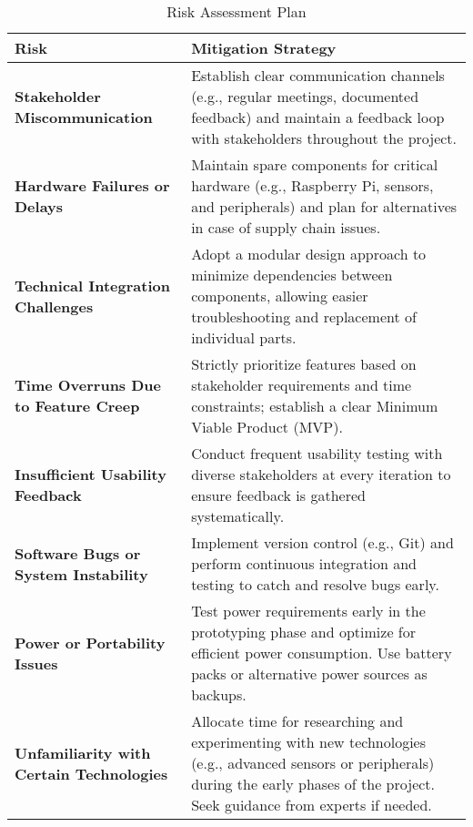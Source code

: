 \begin{table}[h!]
	\centering
	\caption{Risk Assessment Plan}
	\begin{tabular}{|p{4cm}|p{8cm}|}
		\hline
		\textbf{Risk} & \textbf{Mitigation Strategy} \\
		\hline
		\textbf{Stakeholder Miscommunication} & Establish clear communication channels (e.g., regular meetings, documented feedback) and maintain a feedback loop with stakeholders throughout the project. \\
		\hline
		\textbf{Hardware Failures or Delays} & Maintain spare components for critical hardware (e.g., Raspberry Pi, sensors, and peripherals) and plan for alternatives in case of supply chain issues. \\
		\hline
		\textbf{Technical Integration Challenges} & Adopt a modular design approach to minimize dependencies between components, allowing easier troubleshooting and replacement of individual parts. \\
		\hline
		\textbf{Time Overruns Due to Feature Creep} & Strictly prioritize features based on stakeholder requirements and time constraints; establish a clear Minimum Viable Product (MVP). \\
		\hline
		\textbf{Insufficient Usability Feedback} & Conduct frequent usability testing with diverse stakeholders at every iteration to ensure feedback is gathered systematically. \\
		\hline
		\textbf{Software Bugs or System Instability} & Implement version control (e.g., Git) and perform continuous integration and testing to catch and resolve bugs early. \\
		\hline
		\textbf{Power or Portability Issues} & Test power requirements early in the prototyping phase and optimize for efficient power consumption. Use battery packs or alternative power sources as backups. \\
		\hline
		\textbf{Unfamiliarity with Certain Technologies} & Allocate time for researching and experimenting with new technologies (e.g., advanced sensors or peripherals) during the early phases of the project. Seek guidance from experts if needed. \\
		\hline
	\end{tabular}
	\label{tab:risk-assessment}
\end{table}